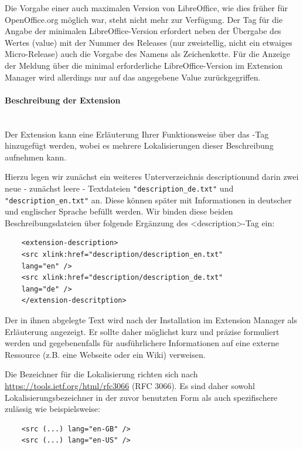 \documentclass[12pt,a4paper,titlepage]{book}
\begin{document}
Die Vorgabe einer auch maximalen Version von LibreOffice, wie dies früher für OpenOffice.org möglich war, steht nicht mehr zur Verfügung. Der Tag für die Angabe der minimalen LibreOffice-Version erfordert neben der Übergabe des Wertes (\glqq value\grqq ) mit der Nummer des Releases (nur zweistellig, nicht ein etwaiges Micro-Release) auch die Vorgabe des Namens als Zeichenkette. Für die Anzeige der Meldung über die minimal erforderliche LibreOffice-Version im Extension Manager wird allerdings nur auf das angegebene Value zurückgegriffen.

\paragraph*{Beschreibung der Extension}$~~$\\

Der Extension kann eine Erläuterung Ihrer Funktionsweise über das -Tag hinzugefügt werden, wobei es mehrere Lokalisierungen dieser Beschreibung aufnehmen kann.

Hierzu legen wir zunächst ein weiteres Unterverzeichnis \glqq description\grqq und darin zwei neue - zunächst leere - Textdateien \verb|"description_de.txt"| und \verb|"description_en.txt"| an. Diese können später mit Informationen in deutscher und englischer Sprache befüllt werden. Wir binden diese beiden Beschreibungsdateien über folgende Ergänzung des <description>-Tag ein:
\begin{lstlisting}
	<extension-description>
	<src xlink:href="description/description_en.txt" 
	lang="en" />
	<src xlink:href="description/description_de.txt" 
	lang="de" />
	</extension-descritption>
\end{lstlisting}

Der in ihnen abgelegte Text wird nach der Installation im Extension Manager als Erläuterung angezeigt. Er sollte daher möglichst kurz und präzise formuliert werden und gegebenenfalls für ausführlichere Informationen auf eine externe Ressource (z.B. eine Webseite oder ein Wiki) verweisen.

Die Bezeichner für die Lokalisierung richten sich nach \url{https://tools.ietf.org/html/rfc3066} (RFC 3066). Es sind daher sowohl Lokalisierungsbezeichner in der zuvor benutzten Form als auch spezifischere zulässig wie beispielsweise:
\begin{lstlisting}
	<src (...) lang="en-GB" />
	<src (...) lang="en-US" />
\end{lstlisting}
\end{document}
